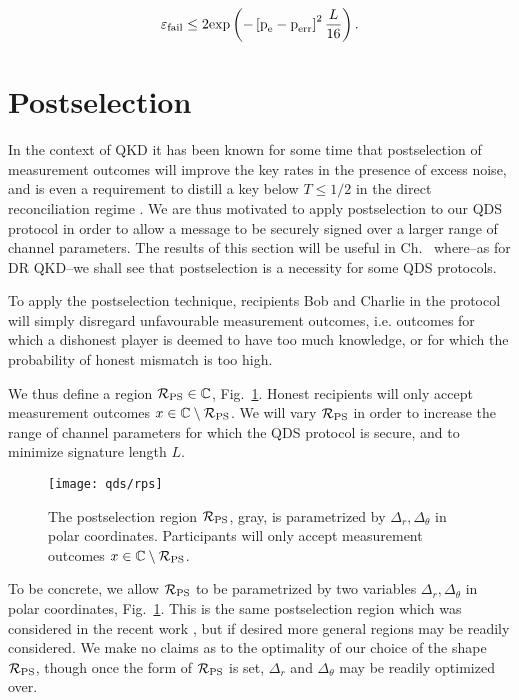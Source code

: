 \begin{equation}\label{eqn:efail}
\varepsilon_{\text{fail}} \le 2 \text{exp}\left( - \left[\text{p}_{\text{e}} - \text{p}_{\text{err}}\right]^2 \frac{L}{16}\right).
\end{equation}




\section{Postselection}
In the context of QKD it has been known for some time that postselection of measurement outcomes will improve the key rates in the presence of excess noise, and is even a requirement to distill a key below $T \le 1/2$ in the direct reconciliation regime . We are thus motivated to apply postselection to our QDS protocol in order to allow a message to be securely signed over a larger range of channel parameters. The results of this section will be useful in Ch.~ where--as for DR QKD--we shall see that postselection is a necessity for some QDS protocols.

To apply the postselection technique, recipients Bob and Charlie in the protocol will simply disregard unfavourable measurement outcomes, i.e. outcomes for which a dishonest player is deemed to have too much knowledge, or for which the probability of honest mismatch is too high.

We thus define a region $\mathcal{R}_{\text{PS}} \in \mathbb{C}$, Fig.~\ref{fig:rps}. Honest recipients will only accept measurement outcomes $x \in \mathbb{C}\setminus\mathcal{R}_{\text{PS}}$. We will vary $\mathcal{R}_{\text{PS}}$ in order to increase the range of channel parameters for which the QDS protocol is secure, and to minimize signature length $L$.

\begin{figure}[htp]
\centering
\texttt{[image: qds/rps]}
\caption{\label{fig:rps} The postselection region $\mathcal{R}_{\text{PS}}$, gray, is parametrized by $\Delta_r, \Delta_\theta$ in polar coordinates. Participants will only accept measurement outcomes $x \in \mathbb{C} \setminus \mathcal{R}_{\text{PS}}$. }
\end{figure}

To be concrete, we allow $\mathcal{R}_{\text{PS}}$ to be parametrized by two variables $\Delta_r, \Delta_\theta$ in polar coordinates, Fig.~\ref{fig:rps}. This is the same postselection region which was considered in the recent work , but if desired more general regions may be readily considered. We make no claims as to the optimality of our choice of the shape $\mathcal{R}_{\text{PS}}$, though once the form of $\mathcal{R}_{\text{PS}}$ is set, $\Delta_r$ and $\Delta_\theta$ may be readily optimized over.

